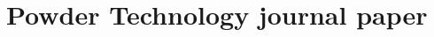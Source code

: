 \documentclass[a4paper,oneside,10pt,openright]{report}
\begin{document}
\appendix
\chapter[Powder Technology journal paper]{Powder Technology journal paper}
\label{app:powtecpaper}


%


\pagestyle{plain}


\setlength{\columnsep}{1.5cm}
\renewcommand*{\nompreamble}{\begin{multicols}{2}}
\renewcommand*{\nompostamble}{\end{multicols}}

\printnomenclature  %












 

\pagestyle{empty} %







\listoftodos[Notes]
\end{document}
